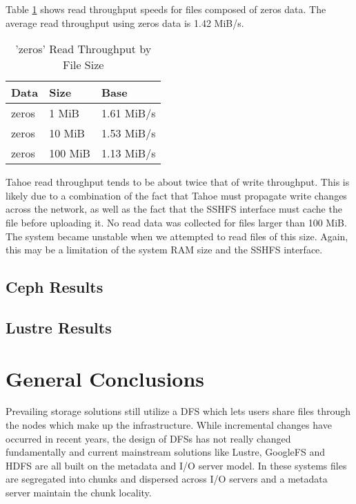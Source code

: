 \documentclass[11pt]{article}
\begin{document}
Table \ref{tbl:TahoeReadZeros} shows read throughput speeds for files
composed of zeros data. The average read throughput using
zeros data is 1.42 MiB/s.

\begin{table}
  \begin{center}
    \begin{tabularx}{\textwidth}{|X|X|X|}
      \hline
      {\bf Data} & {\bf Size} & {\bf Base} \\ \hline
      zeros & 1 MiB & 1.61 MiB/s \\ \hline
      zeros & 10 MiB & 1.53 MiB/s \\ \hline
      zeros & 100 MiB & 1.13 MiB/s \\ \hline
    \end{tabularx}
    \caption{'zeros' Read Throughput by File Size}
    \label{tbl:TahoeReadZeros}
  \end{center}
\end{table}

Tahoe read throughput tends to be about twice that of write
throughput. This is likely due to a combination of the fact that Tahoe
must propagate write changes across the network, as well as the fact
that the SSHFS interface must cache the file before uploading it. No
read data was collected for files larger than 100 MiB. The system
became unstable when we attempted to read files of this size. Again,
this may be a limitation of the system RAM size and the SSHFS interface.

\subsection{Ceph Results}

\subsection{Lustre Results}

\section{General Conclusions}
Prevailing storage solutions still utilize a DFS which lets users share 
files through the nodes which make up the infrastructure. While incremental 
changes have occurred in recent years, the design of DFSs has not really 
changed fundamentally and current mainstream solutions like Lustre, GoogleFS  
and HDFS are all built on the metadata and I/O server model.  In these 
systems files are segregated into chunks and dispersed across I/O servers and 
a metadata server maintain the chunk locality. 
\end{document}
